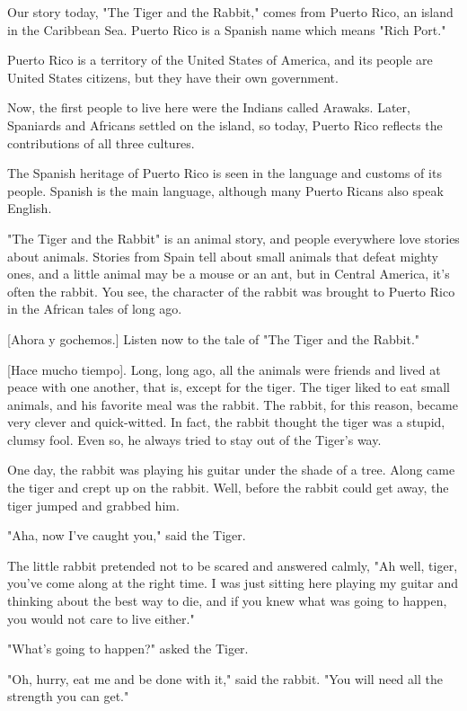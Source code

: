 Our story today, "The Tiger and the Rabbit," comes from Puerto Rico, an island in the Caribbean Sea. Puerto Rico is a Spanish name which means "Rich Port."

Puerto Rico is a territory of the United States of America, and its people are United States citizens, but they have their own government.

Now, the first people to live here were the Indians called Arawaks. Later, Spaniards and Africans settled on the island, so today, Puerto Rico reflects the contributions of all three cultures.

The Spanish heritage of Puerto Rico is seen in the language and customs of its people. Spanish is the main language, although many Puerto Ricans also speak English.

"The Tiger and the Rabbit" is an animal story, and people everywhere love stories about animals. Stories from Spain tell about small animals that defeat mighty ones, and a little animal may be a mouse or an ant, but in Central America, it's often the rabbit. You see, the character of the rabbit was brought to Puerto Rico in the African tales of long ago.

    [Ahora y gochemos.] Listen now to the tale of "The Tiger and the Rabbit."

[Hace mucho tiempo]. Long, long ago, all the animals were friends and lived at peace with one another, that is, except for the tiger. The tiger liked to eat small animals, and his favorite meal was the rabbit. The rabbit, for this reason, became very clever and quick-witted. In fact, the rabbit thought the tiger was a stupid, clumsy fool. Even so, he always tried to stay out of the Tiger's way.

One day, the rabbit was playing his guitar under the shade of a tree. Along came the tiger and crept up on the rabbit. Well, before the rabbit could get away, the tiger jumped and grabbed him.

"Aha, now I've caught you," said the Tiger.

The little rabbit pretended not to be scared and answered calmly, "Ah well, tiger, you've come along at the right time. I was just sitting here playing my guitar and thinking about the best way to die, and if you knew what was going to happen, you would not care to live either."

"What's going to happen?" asked the Tiger.

"Oh, hurry, eat me and be done with it," said the rabbit. "You will need all the strength you can get."

